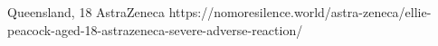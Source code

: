           {Queensland, }
          {18}
          {AstraZeneca}
          {}
          {
          }
          {https://nomoresilence.world/astra-zeneca/ellie-peacock-aged-18-astrazeneca-severe-adverse-reaction/}



